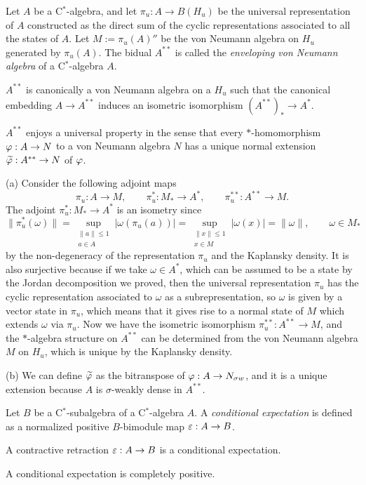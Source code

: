 \documentclass{../../large}
\begin{document}
\begin{prb}
Let $A$ be a C$^*$-algebra, and let $\pi_u:A\to B(H_u)$ be the universal representation of $A$ constructed as the direct sum of the cyclic representations associated to all the states of $A$.
Let $M:=\pi_u(A)''$ be the von Neumann algebra on $H_u$ generated by $\pi_u(A)$.
The bidual $A^{**}$ is called the \emph{enveloping von Neumann algebra} of a C$^*$-algebra $A$.
\begin{parts}
\item $A^{**}$ is canonically a von Neumann algebra on a $H_u$ such that the canonical embedding $A\to A^{**}$ induces an isometric isomorphism $(A^{**})_*\to A^*$.
\item $A^{**}$ enjoys a universal property in the sense that every $*$-homomorphism $\varphi:A\to N$ to a von Neumann algebra $N$ has a unique normal extension $\widetilde{\varphi}:A^{**}\to N$ of $\varphi$.
\end{parts}
\end{prb}
\begin{pf}
(a)
Consider the following adjoint maps
\[\pi_u:A\to M,\qquad\pi_u^*:M_*\to A^*,\qquad\pi_u^{**}:A^{**}\to M.\]
The adjoint $\pi_u^*:M_*\to A^*$ is an isometry since
\[\|\pi_u^*(\omega)\|=\sup_{\substack{\|a\|\le1\\a\in A}}|\omega(\pi_u(a))|=\sup_{\substack{\|x\|\le1\\x\in M}}|\omega(x)|=\|\omega\|,\qquad \omega\in M_*\]
by the non-degeneracy of the representation $\pi_u$ and the Kaplansky density.
It is also surjective because if we take $\omega\in A^*$, which can be assumed to be a state by the Jordan decomposition we proved, then the universal representation $\pi_u$ has the cyclic representation associated to $\omega$ as a subrepresentation, so $\omega$ is given by a vector state in $\pi_u$, which means that it gives rise to a normal state of $M$ which extends $\omega$ via $\pi_u$.
Now we have the isometric isomorphism $\pi_u^{**}:A^{**}\to M$, and the $*$-algebra structure on $A^{**}$ can be determined from the von Neumann algebra $M$ on $H_u$, which is unique by the Kaplansky density.

(b)
We can define $\widetilde{\varphi}$ as the bitranspose of $\varphi:A\to N_{\sigma w}$, and it is a unique extension because $A$ is $\sigma$-weakly dense in $A^{**}$.
\end{pf}



\begin{prb}
Let $B$ be a C$^*$-subalgebra of a C$^*$-algebra $A$.
A \emph{conditional expectation} is defined as a normalized positive $B$-bimodule map $\varepsilon:A\to B$.
\begin{parts}
\item A contractive retraction $\varepsilon:A\to B$ is a conditional expectation.
\item A conditional expectation is completely positive.
\end{parts}
\end{prb}
\end{document}
